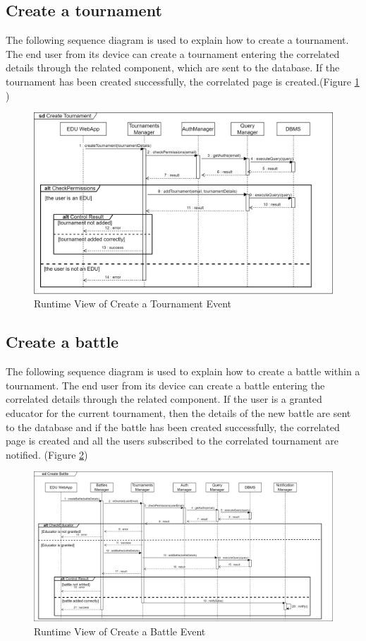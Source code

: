 \subsection{Create a tournament}
The following sequence diagram is used to explain how to create a tournament. The end user from its device can create a tournament entering the correlated details through the related component, which are sent to the database. If the tournament has been created successfully, the correlated page is created.(Figure \ref{fig:RuntimeView_CreateTournament} )
\begin{figure}[H]
    \centering
    \includegraphics[width=\textwidth]{images/runtimeviews/RuntimeView_CreateTournament.png}
    \caption{Runtime View of Create a Tournament Event}
    \label{fig:RuntimeView_CreateTournament}
\end{figure}

\subsection{Create a battle}
The following sequence diagram is used to explain how to create a battle within a tournament. The end user from its device can create a battle entering the correlated details through the related component. If the user is a granted educator for the current tournament, then the details of the new battle are sent to the database and if the battle has been created successfully, the correlated page is created and all the users subscribed to the correlated tournament are notified. (Figure \ref{fig:RuntimeView_CreateBattle})
\begin{figure}[H]
    \centering
    \includegraphics[width=\textwidth]{images/runtimeviews/RuntimeView_CreateBattle.png}
    \caption{Runtime View of Create a Battle Event}
    \label{fig:RuntimeView_CreateBattle}
\end{figure}

